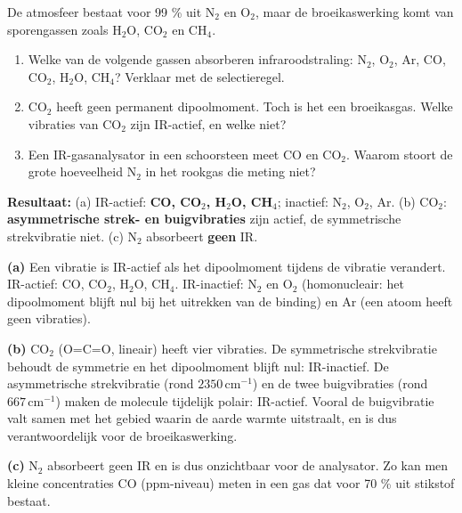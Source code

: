 \begin{oefening}
De atmosfeer bestaat voor 99 \% uit \(\mathrm{N_2}\) en \(\mathrm{O_2}\), maar de broeikaswerking komt van sporengassen zoals \(\mathrm{H_2O}\), \(\mathrm{CO_2}\) en \(\mathrm{CH_4}\).

\begin{enumerate}
\item[(a)]
  Welke van de volgende gassen absorberen infraroodstraling: \(\mathrm{N_2}\), \(\mathrm{O_2}\), \(\mathrm{Ar}\), \(\mathrm{CO}\), \(\mathrm{CO_2}\), \(\mathrm{H_2O}\), \(\mathrm{CH_4}\)? Verklaar met de selectieregel.
\item[(b)]
  \(\mathrm{CO_2}\) heeft geen permanent dipoolmoment. Toch is het een broeikasgas. Welke vibraties van \(\mathrm{CO_2}\) zijn IR-actief, en welke niet?
\item[(c)]
  Een IR-gasanalysator in een schoorsteen meet \(\mathrm{CO}\) en \(\mathrm{CO_2}\). Waarom stoort de grote hoeveelheid \(\mathrm{N_2}\) in het rookgas die meting niet?
\end{enumerate}
\end{oefening}
\begin{oplossing}
\textbf{Resultaat:} (a) IR-actief: \textbf{CO, CO\ensuremath{_{2}}, H\ensuremath{_{2}}O, CH\ensuremath{_{4}}}; inactief: N\ensuremath{_{2}}, O\ensuremath{_{2}}, Ar. (b) CO\ensuremath{_{2}}: \textbf{asymmetrische strek- en buigvibraties} zijn actief, de symmetrische strekvibratie niet. (c) N\ensuremath{_{2}} absorbeert \textbf{geen} IR.

\textbf{(a)} Een vibratie is IR-actief als het dipoolmoment tijdens de vibratie verandert. IR-actief: \(\mathrm{CO}\), \(\mathrm{CO_2}\), \(\mathrm{H_2O}\), \(\mathrm{CH_4}\). IR-inactief: \(\mathrm{N_2}\) en \(\mathrm{O_2}\) (homonucleair: het dipoolmoment blijft nul bij het uitrekken van de binding) en \(\mathrm{Ar}\) (een atoom heeft geen vibraties).

\textbf{(b)} \(\mathrm{CO_2}\) (O=C=O, lineair) heeft vier vibraties. De symmetrische strekvibratie behoudt de symmetrie en het dipoolmoment blijft nul: IR-inactief. De asymmetrische strekvibratie (rond \(2350\,\mathrm{cm^{-1}}\)) en de twee buigvibraties (rond \(667\,\mathrm{cm^{-1}}\)) maken de molecule tijdelijk polair: IR-actief. Vooral de buigvibratie valt samen met het gebied waarin de aarde warmte uitstraalt, en is dus verantwoordelijk voor de broeikaswerking.

\textbf{(c)} \(\mathrm{N_2}\) absorbeert geen IR en is dus onzichtbaar voor de analysator. Zo kan men kleine concentraties CO (ppm-niveau) meten in een gas dat voor 70 \% uit stikstof bestaat.
\end{oplossing}

